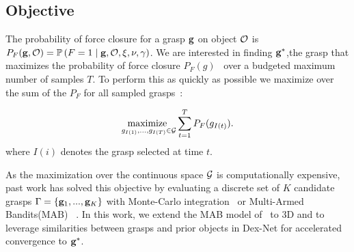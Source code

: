 \subsection{Objective}
The probability of force closure for a grasp $\mathbf{g}$ on object $\mathcal{O}$ is $P_F(\mathbf{g}, \mathcal{O}) = \mathbb{P}\left(F = 1 \mid \mathbf{g}, \mathcal{O}, \xi, \nu, \gamma \right)$.
We are interested in finding $\mathbf{g}^*$,the grasp that maximizes the probability of force closure $P_F(g)$~\cite{kim2012physically, laskey2015bandits, mahler2015gp, weisz2012pose} over a budgeted maximum number of samples $T$.
To perform this as quickly as possible we maximize over the sum of the $P_F$ for all sampled grasps~\cite{laskey2015bandits, srinivas10gaussian}:

\vspace{-2ex}
\begin{align}
	\underset{g_{I(1)}, ..., g_{I(T)} \in \mathcal{G}}{\text{maximize }} \sum \limits_{t=1}^T P_F(g_{I(t)}). \label{eq:objective}
\end{align}
\noindent where $I(i)$ denotes the grasp selected at time $t$.

As the maximization over the continuous space $\mathcal{G}$ is computationally expensive, past work has solved this objective by evaluating a discrete set of $K$ candidate grasps $\Gamma = \left\{ \mathbf{g}_1, ..., \mathbf{g}_K \right\}$ with Monte-Carlo integration~\cite{kehoe2012toward, weisz2012pose} or Multi-Armed Bandits(MAB) ~\cite{laskey2015bandits}.
In this work, we extend the MAB model of~\cite{laskey2015bandits} to 3D and to leverage similarities between grasps and prior objects in Dex-Net for accelerated convergence to $\mathbf{g}^*$.